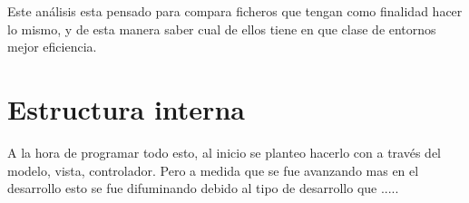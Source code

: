 Este análisis esta pensado para compara ficheros que tengan como finalidad hacer lo mismo, y de esta manera saber cual de ellos tiene en que clase de entornos mejor eficiencia.

\section{Estructura interna}

A la hora de programar todo esto, al inicio se planteo hacerlo con a través del modelo, vista, controlador. Pero a medida que se fue avanzando mas en el desarrollo esto se fue difuminando debido al tipo de desarrollo que .....

